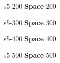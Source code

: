 \documentclass{beamer}
\def \firstcat {\textbf{Space}}
\begin{document}
\content                       
{s5-200}                     
{\firstcat}                          
{200}{             
}


\content           
{s5-300}                     
{\firstcat}                          
{300}{                       
}


\content                       
{s5-400}                     
{\firstcat}                          
{400}{       
}


\content                       
{s5-500}                     
{\firstcat}                          
{500}{    
}
\end{document}
